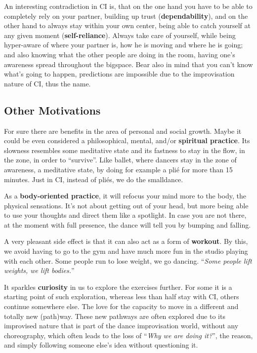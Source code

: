An interesting contradiction in CI is, that on the one hand you have to be able to completely rely on your partner, building up trust (\textbf{dependability}), and on the other hand to always stay within your own center, being able to catch yourself at any given moment (\textbf{self-reliance}).
Always take care of yourself, while being hyper-aware of where your partner is, how he is moving and where he is going;
and also knowing what the other people are doing in the room, having one's awareness spread throughout the \gls{bigspace}.
Bear also in mind that you can't know what's going to happen, predictions are impossible due to the improvisation nature of CI, thus the name.

\subsection{Other Motivations}\label{subsec:other-motivations}

For sure there are benefits in the area of personal and social growth.
Maybe it could be even considered a philosophical, mental, and/or \textbf{spiritual practice}.
Its slowness resembles some meditative state and its fastness to stay in the flow, in the zone, in order to ``survive''.
Like ballet, where dancers stay in the zone of awareness, a meditative state, by doing for example a plié for more than 15 minutes.
Just in CI, instead of pliés, we do the \gls{smalldance}.

As a \textbf{body-oriented practice}, it will refocus your mind more to the body, the physical sensations.
It's not about getting out of your head, but more being able to use your thoughts and direct them like a spotlight.
In case you are not there, at the moment with full presence, the dance will tell you by bumping and falling.

A very pleasant side effect is that it can also act as a form of \textbf{workout}.
By this, we avoid having to go to the gym and have much more fun in the studio playing with each other.
Some people run to lose weight, we go dancing.
``\textit{Some people lift weights, we lift bodies.}''

It sparkles \textbf{curiosity} in us to explore the exercises further.
For some it is a starting point of such exploration, whereas less than half stay with CI, others continue somewhere else.
The love for the capacity to move in a different and totally new (path)way.
These new pathways are often explored due to its improvised nature that is part of the dance improvisation world, without any choreography, which often leads to the loss of ``\textit{Why we are doing it?}'', the reason, and simply following someone else's idea without questioning it.

